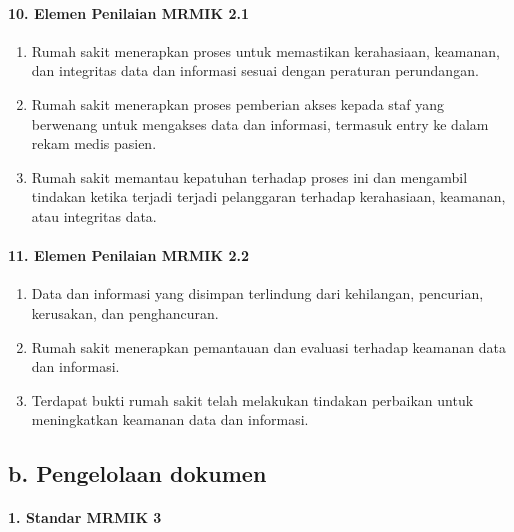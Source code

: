 \documentclass[
]{book}
\providecommand{\tightlist}{%
  \setlength{\itemsep}{0pt}\setlength{\parskip}{0pt}}
\begin{document}
\hypertarget{elemen-penilaian-mrmik-2.1}{%
\paragraph*{10. Elemen Penilaian MRMIK 2.1}\label{elemen-penilaian-mrmik-2.1}}

\begin{enumerate}
\def\labelenumi{\alph{enumi}.}
\tightlist
\item
  Rumah sakit menerapkan proses untuk memastikan kerahasiaan, keamanan, dan integritas data dan informasi sesuai dengan peraturan perundangan.
\item
  Rumah sakit menerapkan proses pemberian akses kepada staf yang berwenang untuk mengakses data dan informasi, termasuk entry ke dalam rekam medis pasien.
\item
  Rumah sakit memantau kepatuhan terhadap proses ini dan mengambil tindakan ketika terjadi terjadi pelanggaran terhadap kerahasiaan, keamanan, atau integritas data.
\end{enumerate}

\hypertarget{elemen-penilaian-mrmik-2.2}{%
\paragraph*{11. Elemen Penilaian MRMIK 2.2}\label{elemen-penilaian-mrmik-2.2}}

\begin{enumerate}
\def\labelenumi{\alph{enumi}.}
\tightlist
\item
  Data dan informasi yang disimpan terlindung dari kehilangan, pencurian, kerusakan, dan penghancuran.
\item
  Rumah sakit menerapkan pemantauan dan evaluasi terhadap keamanan data dan informasi.
\item
  Terdapat bukti rumah sakit telah melakukan tindakan perbaikan untuk meningkatkan keamanan data dan informasi.
\end{enumerate}

\hypertarget{b.-pengelolaan-dokumen}{%
\subsection*{b. Pengelolaan dokumen}\label{b.-pengelolaan-dokumen}}

\hypertarget{standar-mrmik-3}{%
\paragraph*{1. Standar MRMIK 3}\label{standar-mrmik-3}}
\end{document}
